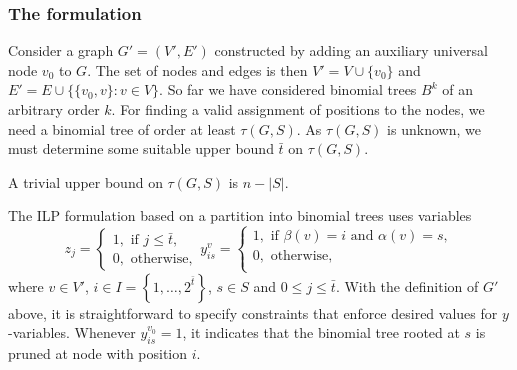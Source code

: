 \subsubsection{The formulation}
Consider a graph $G'=(V',E')$ constructed  by adding an auxiliary universal node $v_0$ to $G$.
The set of nodes and edges is then $V'=V\cup \{v_0\}$ and $E'=E\cup\{\{v_0,v\}:v\in V\}$.
So far we have considered binomial trees $B^k$ of an arbitrary order $k$.
For finding a valid assignment of positions to the nodes, we need a binomial tree of order at least $\tau(G,S)$.
As $\tau(G,S)$ is unknown, we must determine some suitable upper bound $\bar{t}$ on $\tau(G,S)$.  
\begin{observation}
A trivial upper bound on $\tau(G,S)$ is $n-|S|$.
\end{observation}
The ILP formulation based on a partition into binomial trees uses variables
$$
z_{j}=
\begin{cases}
1, \text{ if } j\leq \bar{t},\\
0, \text{ otherwise},
\end{cases}
y_{is}^v=
\begin{cases}
1, \text{ if } \beta(v)=i \text{ and } \alpha(v)=s,\\
0, \text{ otherwise},\\
\end{cases}
$$
where $v\in V'$, $i\in I=\left\{1,\dots,2^{\bar{t}}\right\}$, $s\in S$ and $0\leq j\leq \bar{t}$.
With the definition of $G'$ above, it is straightforward to specify constraints that enforce desired values for $y$-variables.
Whenever $y_{is}^{v_0}=1$, it indicates that the binomial tree rooted at $s$ is pruned at node with position $i$.
